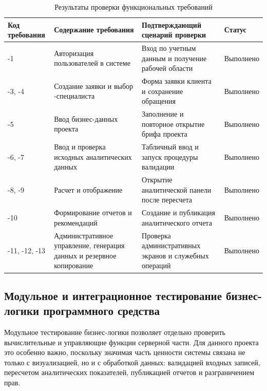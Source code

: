 \begin{table}[H]
    \caption{Результаты проверки функциональных требований}
    \label{tab:functional-requirements-testing}
    {\small
    \setlength{\tabcolsep}{3pt}
    \begin{tabularx}{\textwidth}{|P{0.12\textwidth}|P{0.28\textwidth}|L|P{0.10\textwidth}|}
        \hline
        Код требования & Содержание требования & Подтверждающий сценарий проверки & Статус \\
        \hline
        -1 & Авторизация пользователей в системе & Вход по учетным данным и получение рабочей области & Выполнено \\
        \hline
        -3, -4 & Создание заявки и выбор -специалиста & Форма заявки клиента и сохранение обращения & Выполнено \\
        \hline
        -5 & Ввод бизнес-данных проекта & Заполнение и повторное открытие брифа проекта & Выполнено \\
        \hline
        -6, -7 & Ввод и проверка исходных аналитических данных & Табличный ввод и запуск процедуры валидации & Выполнено \\
        \hline
        -8, -9 & Расчет  и отображение  & Открытие аналитической панели после пересчета & Выполнено \\
        \hline
        -10 & Формирование отчетов и рекомендаций & Создание и публикация аналитического отчета & Выполнено \\
        \hline
        -11, -12, -13 & Административное управление, генерация данных и резервное копирование & Проверка административных экранов и служебных операций & Выполнено \\
        \hline
    \end{tabularx}
    }
\end{table}

\subsection{Модульное и интеграционное тестирование бизнес-логики программного средства}

Модульное тестирование бизнес-логики позволяет отдельно проверить вычислительные и управляющие функции серверной части. Для данного проекта это особенно важно, поскольку значимая часть ценности системы связана не только с визуализацией, но и с обработкой данных: валидацией входных записей, пересчетом аналитических показателей, публикацией отчетов и разграничением прав.

